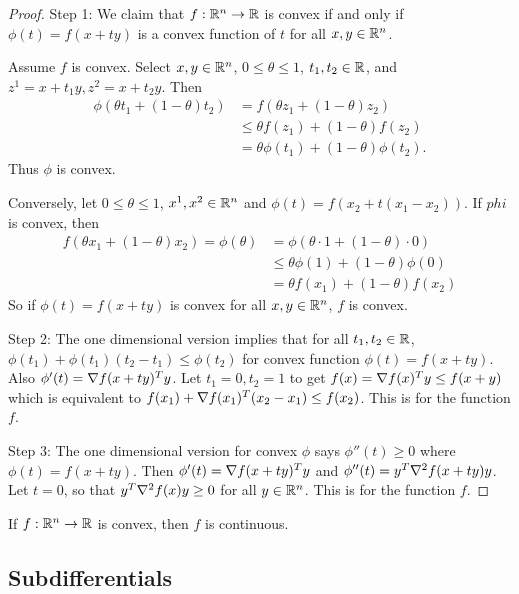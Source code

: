 \begin{proof}
Step 1:
We claim that $f: \mathbb{R}^n \to \mathbb{R}$ is convex if and only if $\phi(t) = f(x+ty)$ is a convex function of $t$ for all $x,y \in \mathbb{R}^n$.

Assume $f$ is convex.
Select $x, y \in \mathbb{R}^n$, $0 \le \theta \le 1$, $t_1, t_2 \in \mathbb{R}$, and $z^1 = x + t_1 y, z^2 = x + t_2 y$.
Then 
\begin{align}
\phi(\theta t_1 + (1-\theta) t_2) &= f(\theta z_1 + (1-\theta) z_2) \\
&\le \theta f(z_1) + (1-\theta) f(z_2) \\
&= \theta \phi(t_1) + (1-\theta) \phi(t_2).
\end{align}
Thus $\phi$ is convex.

Conversely, let $0 \le \theta \le 1$, $x^1, x^2 \in \mathbb{R}^n$ and $\phi(t) = f(x_2 + t(x_1-x_2))$.
If $phi$ is convex, then
\begin{align}
f(\theta x_1 + (1-\theta) x_2) = \phi(\theta) &= \phi(\theta \cdot 1 + (1-\theta) \cdot 0) \\
&\le \theta \phi(1) + (1-\theta) \phi(0) \\
&= \theta f(x_1) + (1-\theta) f(x_2)
\end{align}
So if $\phi(t) = f(x+ty)$ is convex for all $x,y \in \mathbb{R}^n$, $f$ is convex.

Step 2:
The one dimensional version  implies that for all $t_1, t_2 \in \mathbb{R} $, $\phi(t_1) + \phi(t_1) (t_2 - t_1) \le \phi(t_2)$ for convex function $\phi(t) = f(x+ty)$.
Also $\phi'(t) = \nabla f(x +ty)^T y$.
Let $t_1 = 0, t_2 = 1$ to get $f(x) = \nabla f(x)^T y \le f(x+y)$ which is equivalent to $f(x_1) + \nabla f(x_1)^T (x_2 - x_1) \le f(x_2)$.
This is  for the function $f$.

Step 3:
The one dimensional version  for convex $\phi$ says $\phi''(t) \ge 0$ where $\phi(t) = f(x+ty)$.
Then $\phi'(t) = \nabla f(x+ty)^T y$ and $\phi''(t) = y^T \nabla ^2 f(x+ty) y$.
Let $t=0$, so that $y^T \nabla ^2 f(x) y \ge 0$ for all $y \in \mathbb{R}^n$.
This is  for the function $f$.
\end{proof}

\begin{theorem}
If $f:\mathbb{R}^n \to \mathbb{R}$ is convex, then $f$ is continuous.
\end{theorem}

\subsection{Subdifferentials}


